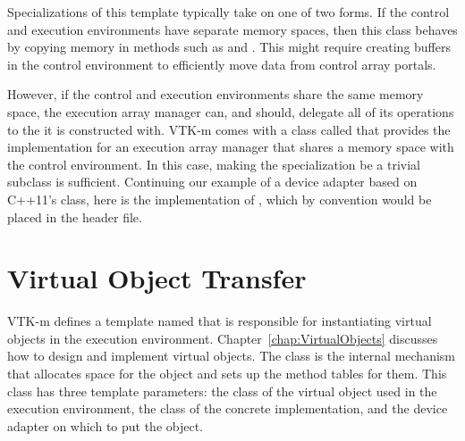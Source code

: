 Specializations of this template typically take on one of two forms. If the
control and execution environments have separate memory spaces, then this
class behaves by copying memory in methods such as
 and . This might
require creating buffers in the control environment to efficiently move
data from control array portals.

However, if the control and execution environments share the same memory
space, the execution array manager can, and should, delegate all of its
operations to the  it is constructed with. VTK-m
comes with a class called
 that provides the
implementation for an execution array manager that shares a memory space
with the control environment. In this case, making the
 specialization be a trivial subclass
is sufficient. Continuing our example of a device adapter based on C++11's
 class, here is the implementation of
, which by convention would be placed
in the
header file.



\section{Virtual Object Transfer}


VTK-m defines a template named  that is responsible for instantiating virtual objects in the execution environment.
Chapter~\ref{chap:VirtualObjects} discusses how to design and implement virtual objects.
The  class is the internal mechanism that  allocates space for the object and sets up the method tables for them.
This class has three template parameters: the class of the virtual object used in the execution environment, the class of the concrete implementation, and the device adapter on which to put the object.


